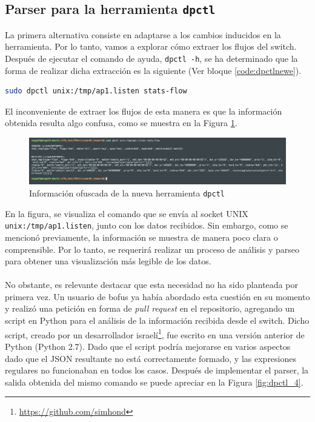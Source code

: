 \subsection{Parser para la herramienta \texttt{dpctl}}

La primera alternativa consiste en adaptarse a los cambios inducidos en la herramienta. Por lo tanto, vamos a explorar cómo extraer los flujos del switch. Después de ejecutar el comando de ayuda, \texttt{dpctl -h}, se ha determinado que la forma de realizar dicha extracción es la siguiente (Ver bloque \ref{code:dpctlnewe}).

\begin{lstlisting}[language= bash, style=Consola, caption={Extracción de flujos con la nueva versión de dpctl},label=code:dpctlnewe]
    sudo dpctl unix:/tmp/ap1.listen stats-flow
\end{lstlisting}
\vspace{0.5cm}

El inconveniente de extraer los flujos de esta manera es que la información obtenida resulta algo confusa, como se muestra en la Figura \ref{fig:dpctl_3}.

\begin{figure}[ht]
    \centering
    \includegraphics[width=\textwidth]{archivos/img/dev/dpctl_3.png}
    \caption{Información ofuscada de la nueva herramienta \texttt{dpctl}}
    \label{fig:dpctl_3}
\end{figure}

En la figura, se visualiza el comando que se envía al socket UNIX \texttt{unix:/tmp/ap1.listen}, junto con los datos recibidos. Sin embargo, como se mencionó previamente, la información se muestra de manera poco clara o comprensible. Por lo tanto, se requerirá realizar un proceso de análisis y parseo para obtener una visualización más legible de los datos.\\
\\

No obstante, es relevante destacar que esta necesidad no ha sido planteada por primera vez. Un usuario de \gls{bofus} ya había abordado esta cuestión en su momento y realizó una petición en forma de \textit{pull request} en el repositorio, agregando un script en Python para el análisis de la información recibida desde el switch. Dicho script, creado por un desarrollador israelí\footnote{\url{https://github.com/simhond}}, fue escrito en una versión anterior de Python (Python 2.7). Dado que el script podría mejorarse en varios aspectos dado que el JSON resultante no está correctamente formado, y las expresiones regulares no funcionaban en todos los casos. Después de implementar el parser, la salida obtenida del mismo comando se puede apreciar en la Figura \ref{fig:dpctl_4}.


